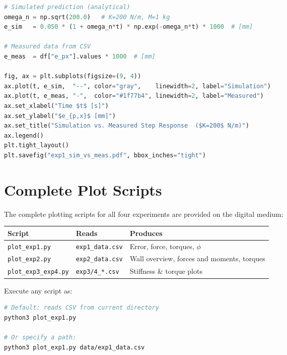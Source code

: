 \begin{lstlisting}[style=cppstyle, language=Python,
  caption={Overlay simulated prediction on measured data},
  label={lst:compare}]
# Simulated prediction (analytical)
omega_n = np.sqrt(200.0)   # K=200 N/m, M=1 kg
e_sim   = 0.050 * (1 + omega_n*t) * np.exp(-omega_n*t) * 1000  # [mm]

# Measured data from CSV
e_meas  = df["e_px"].values * 1000  # [mm]

fig, ax = plt.subplots(figsize=(9, 4))
ax.plot(t, e_sim,  "--", color="gray",    linewidth=2, label="Simulation")
ax.plot(t, e_meas, "-",  color="#1f77b4", linewidth=2, label="Measured")
ax.set_xlabel("Time $t$ [s]")
ax.set_ylabel("$e_{p,x}$ [mm]")
ax.set_title("Simulation vs. Measured Step Response  ($K=200$ N/m)")
ax.legend()
plt.tight_layout()
plt.savefig("exp1_sim_vs_meas.pdf", bbox_inches="tight")
\end{lstlisting}

\section{Complete Plot Scripts}

The complete plotting scripts for all four experiments are provided
on the digital medium:

\begin{center}
\renewcommand{\arraystretch}{1.3}
\begin{tabular}{@{}p{3.8cm}p{3.2cm}p{5cm}@{}}
\toprule
Script & Reads & Produces \\
\midrule
\texttt{plot\_exp1.py} & \texttt{exp1\_data.csv} &
  Error, force, torques, $\phi$ \\
\texttt{plot\_exp2.py} & \texttt{exp2\_data.csv} &
  Wall overview, forces and moments, torques \\
\texttt{plot\_exp3\_exp4.py} & \texttt{exp3/4\_*.csv} &
  Stiffness \& torque plots \\
\bottomrule
\end{tabular}
\end{center}

Execute any script as:
\begin{lstlisting}[style=cppstyle, language=bash,
  caption={Execute a plot script on measured data},
  label={lst:run_plot}]
# Default: reads CSV from current directory
python3 plot_exp1.py

# Or specify a path:
python3 plot_exp1.py data/exp1_data.csv
\end{lstlisting}

